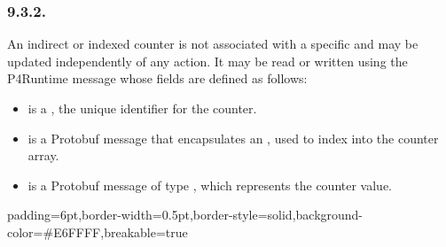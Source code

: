 \documentclass[11pt]{article}
\begin{document}
{%
\subsubsection{9.3.2.\hspace*{0.5em}}\label{sec-counterentry}%

\noindent{}An indirect or indexed counter is not associated with a specific 
and may be updated independently of any action. It may be read or written using
the P4Runtime  message whose fields are defined as follows:%

\begin{itemize}%

\item{}
 is a , the unique identifier for the counter.%

\item{}
 is a Protobuf message that encapsulates an , used to index into
the counter array.%

\item{}
 is a Protobuf message of type , which represents the
counter value.%
\end{itemize}%

\begin{mdbmargintb}{6pt}{6pt}%
\begin{mdblock}{padding=6pt,border-width=0.5pt,border-style=solid,background-color=\#E6FFFF,breakable=true}%
\begin{mdpre}%
\end{mdpre}%
\end{mdblock}%
\end{mdbmargintb}%

}
\end{document}

